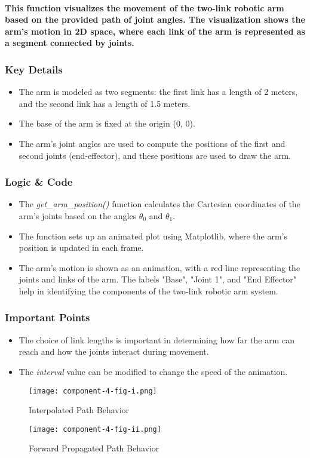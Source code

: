 \documentclass[12pt, letterpaper]{article}
\begin{document}
\paragraph{This function visualizes the movement of the two-link robotic arm based on the provided path of joint angles. The visualization shows the arm's motion in 2D space, where each link of the arm is represented as a segment connected by joints.}
\subsubsection{Key Details}
\begin{itemize}
    \item{The arm is modeled as two segments: the first link has a length of 2 meters, and the second link has a length of 1.5 meters.}
    \item{The base of the arm is fixed at the origin (0, 0).}
    \item{The arm's joint angles are used to compute the positions of the first and second joints (end-effector), and these positions are used to draw the arm.}
\end{itemize}
\subsubsection{Logic \& Code}
\begin{itemize}
    \item{The \textit{get\_arm\_position()} function calculates the Cartesian coordinates of the arm's joints based on the angles $\theta_0$ and $\theta_1$.}
    \item{The function sets up an animated plot using Matplotlib, where the arm's position is updated in each frame.}
    \item{The arm's motion is shown as an animation, with a red line representing the joints and links of the arm. The labels "Base", "Joint 1", and "End Effector" help in identifying the components of the two-link robotic arm system.}
\end{itemize}
\subsubsection{Important Points}
\begin{itemize}
    \item{The choice of link lengths is important in determining how far the arm can reach and how the joints interact during movement.}
    \item{The \textit{interval} value can be modified to change the speed of the animation.}
\end{itemize}
\begin{figure}
    \centering
    \texttt{[image: component-4-fig-i.png]}
    \caption{Interpolated Path Behavior}
    \label{fig:enter-label}
\end{figure}
\begin{figure}
    \centering
    \texttt{[image: component-4-fig-ii.png]}
    \caption{Forward Propagated Path Behavior}
    \label{fig:enter-label}
\end{figure}
\end{document}
